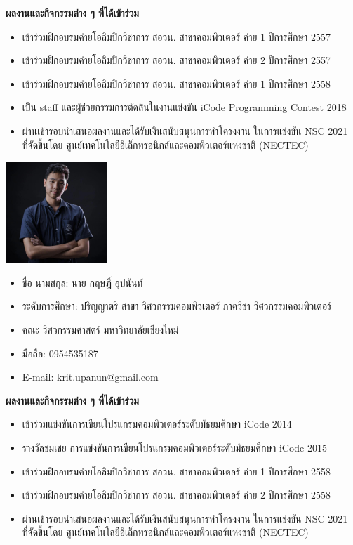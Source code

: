 \documentclass[semifinal]{cpecmu}
\begin{document}
\begin{biosketch}
\noindent \textbf{ผลงานและกิจกรรมต่าง ๆ ที่ได้เข้าร่วม}
\begin{itemize}
  \item เข้าร่วมฝึกอบรมค่ายโอลิมปิกวิชาการ สอวน. สาขาคอมพิวเตอร์ ค่าย 1 ปีการศึกษา 2557
  \item เข้าร่วมฝึกอบรมค่ายโอลิมปิกวิชาการ สอวน. สาขาคอมพิวเตอร์ ค่าย 2 ปีการศึกษา 2557
  \item เข้าร่วมฝึกอบรมค่ายโอลิมปิกวิชาการ สอวน. สาขาคอมพิวเตอร์ ค่าย 1 ปีการศึกษา 2558
  \item เป็น staff และผู้ช่วยกรรมการตัดสินในงานแข่งขัน iCode Programming Contest 2018
  \item ผ่านเข้ารอบนำเสนอผลงานและได้รับเงินสนับสนุนการทำโครงงาน ในการแข่งขัน NSC 2021\\
  ที่จัดขึ้นโดย ศูนย์เทคโนโลยีอิเล็กทรอนิกส์และคอมพิวเตอร์แห่งชาติ (NECTEC)
\end{itemize}
\newpage
\begin{center}
  \includegraphics[width=1.5in]{./images/krit_pic.jpg}
\end{center}
\begin{itemize}[label={},leftmargin=*]
  \item ชื่อ-นามสกุล: นาย กฤษฏิ์ อุปนันท์
  \item ระดับการศึกษา: ปริญญาตรี สาขา วิศวกรรมคอมพิวเตอร์ ภาควิชา วิศวกรรมคอมพิวเตอร์
  \item คณะ วิศวกรรมศาสตร์ มหาวิทยาลัยเชียงใหม่
  \item มือถือ: 0954535187
  \item E-mail: krit.upanun@gmail.com
\end{itemize}


\noindent \textbf{ผลงานและกิจกรรมต่าง ๆ ที่ได้เข้าร่วม}
\begin{itemize}
  \item เข้าร่วมแข่งขันการเขียนโปรแกรมคอมพิวเตอร์ระดับมัธยมศึกษา iCode 2014
  \item รางวัลชมเชย การแข่งขันการเขียนโปรแกรมคอมพิวเตอร์ระดับมัธยมศึกษา iCode 2015
  \item เข้าร่วมฝึกอบรมค่ายโอลิมปิกวิชาการ สอวน. สาขาคอมพิวเตอร์ ค่าย 1 ปีการศึกษา 2558
  \item เข้าร่วมฝึกอบรมค่ายโอลิมปิกวิชาการ สอวน. สาขาคอมพิวเตอร์ ค่าย 2 ปีการศึกษา 2558
  \item ผ่านเข้ารอบนำเสนอผลงานและได้รับเงินสนับสนุนการทำโครงงาน ในการแข่งขัน NSC 2021\\
  ที่จัดขึ้นโดย ศูนย์เทคโนโลยีอิเล็กทรอนิกส์และคอมพิวเตอร์แห่งชาติ (NECTEC)
\end{itemize}

\end{biosketch}
\fi %
\end{document}
